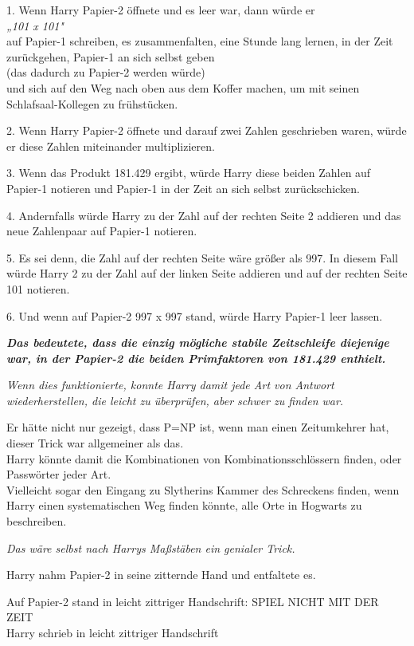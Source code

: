 {1. Wenn Harry Papier-2 öffnete und es leer war, dann würde er\\ \emph{„101 x 101"}\\ auf Papier-1 schreiben, es zusammenfalten, eine Stunde lang lernen, in der Zeit zurückgehen, Papier-1 an sich selbst geben\\ (das dadurch zu Papier-2 werden würde)\\ und sich auf den Weg nach oben aus dem Koffer machen, um mit seinen Schlafsaal-Kollegen zu frühstücken.

2. Wenn Harry Papier-2 öffnete und darauf zwei Zahlen geschrieben waren, würde er diese Zahlen miteinander multiplizieren.

3. Wenn das Produkt 181.429 ergibt, würde Harry diese beiden Zahlen auf Papier-1 notieren und Papier-1 in der Zeit an sich selbst zurückschicken.

4. Andernfalls würde Harry zu der Zahl auf der rechten Seite 2 addieren und das neue Zahlenpaar auf Papier-1 notieren.

5. Es sei denn, die Zahl auf der rechten Seite wäre größer als 997. In diesem Fall würde Harry 2 zu der Zahl auf der linken Seite addieren und auf der rechten Seite 101 notieren.

6. Und wenn auf Papier-2 997 x 997 stand, würde Harry Papier-1 leer lassen.

\textbf{\emph{Das bedeutete, dass die einzig mögliche stabile Zeitschleife diejenige war, in der Papier-2 die beiden Primfaktoren von 181.429 enthielt.}}

\emph{Wenn dies funktionierte, konnte Harry damit jede Art von Antwort wiederherstellen, die leicht zu überprüfen, aber schwer zu finden war.}

Er hätte nicht nur gezeigt, dass P=NP ist, wenn man einen Zeitumkehrer hat, dieser Trick war allgemeiner als das.\\ Harry könnte damit die Kombinationen von Kombinationsschlössern finden, oder Passwörter jeder Art.\\ Vielleicht sogar den Eingang zu Slytherins Kammer des Schreckens finden, wenn Harry einen systematischen Weg finden könnte, alle Orte in Hogwarts zu beschreiben.

\emph{Das wäre selbst nach Harrys Maßstäben ein genialer Trick.}

Harry nahm Papier-2 in seine zitternde Hand und entfaltete es.

Auf Papier-2 stand in leicht zittriger Handschrift: SPIEL NICHT MIT DER ZEIT\\ Harry schrieb in leicht zittriger Handschrift

}
